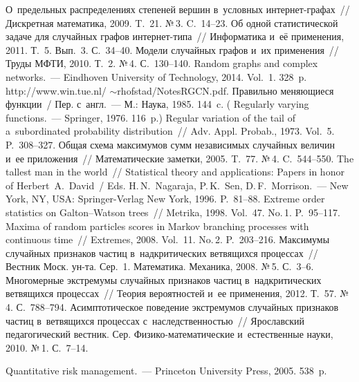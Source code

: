 \begin{multicols}{2}
{{\begin{thebibliography}{99}
 О~предельных распределениях степеней вершин
в~условных ин\-тер\-нет-гра\-фах~// Дискретная математика, 2009. T.~21. №\,3.
C.~14--23.
 Об одной статистической задаче для случайных
графов ин\-тер\-нет-ти\-па~// Информатика и~её применения, 2011. Т.~5. Вып.~3. С.~34--40.
 Модели случайных графов и~их применения~// Труды МФТИ,
2010. Т.~2. №\,4. С.~130--140.
 Random graphs and complex networks.~---
Eindhoven University of Technology, 2014.  Vol.~1. 328~p.
{\sf http://www.win.tue.nl/ $\sim$\/rhofstad/NotesRGCN.pdf}.
 Правильно меняющиеся функции~/ Пер. с~англ.~--- М.:
Наука, 1985. 144~c. ( Regularly varying functions.~--- Springer, 1976.
116~p.)
 Regular variation of the tail of a~subordinated probability
distribution~// Adv. Appl. Probab., 1973. Vol.~5. P.~308--327.
 Общая схема максимумов сумм независимых
случайных величин и~ее приложения~// Математические заметки, 2005.
T.~77. №\,4. C.~544--550.
 The tallest man in the world~//
Statistical theory and applications: Papers in honor of Herbert~A.~David~/
Eds. H.\,N.~Nagaraja, P.\,K.~Sen, D.\,F.~Morrison.~---
New York, NY, USA: Springer-Verlag New York, 1996. P.~81--88.
 Extreme order statistics on Galton--Watson trees~//
Metrika, 1998. Vol.~47. No.\,1. P.~95--117.
 Maxima of random particles scores in Markov
branching processes with continuous time~// Extremes, 2008. Vol.~11. No.\,2. P.~203--216.
 Максимумы случайных признаков час\-тиц
в~надкритических ветвящихся процессах~// Вестник Моск. ун-та.  Сер.~1.
Математика. Механика, 2008. №\,5. С.~3--6.
 Многомерные экстремумы случайных признаков частиц
в~надкритических ветвящихся
процессах~// Теория вероятностей и~ее применения, 2012. Т.~57. №\,4. С.~788--794.
 Асимптотическое поведение экстремумов случайных
признаков частиц в~ветвящихся процессах с~наследственностью~//
Ярославский педагогический вестник. Сер. Фи\-зи\-ко-ма\-те\-ма\-ти\-че\-ские
и~естественные науки, 2010. №\,1. С.~7--14.

Quantitative risk management.~--- Princeton University Press, 2005. 538~p.


\end{thebibliography}}}
\end{multicols}
